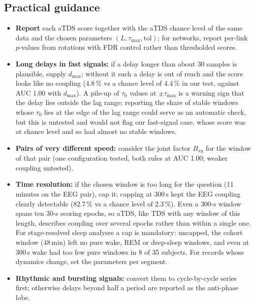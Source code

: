 \documentclass[11pt,a4paper]{article}
\begin{document}
\subsection*{Practical guidance}
\label{sec:guidance}
\begin{itemize}
\item \textbf{Report} each aTDS score together with the aTDS chance level of the same data and the chosen parameters $(L, \tau_{\max}, \mathrm{tol})$; for networks, report per-link $p$-values from rotations with FDR control rather than thresholded scores.
\item \textbf{Long delays in fast signals:} if a delay longer than about 30 samples is plausible, supply $d_{\max}$; without it such a delay is out of reach and the score looks like no coupling (4.8\,\% vs a chance level of 4.4\,\% in our test, against AUC 1.00 with $d_{\max}$). A pile-up of $\tau_0$ values at $\pm\tau_{\max}$ is a warning sign that the delay lies outside the lag range; reporting the share of stable windows whose $\tau_0$ lies at the edge of the lag range could serve as an automatic check, but this is untested and would not flag our fast-signal case, whose score was at chance level and so had almost no stable windows.
\item \textbf{Pairs of very different speed:} consider the joint factor $B_{xy}$ for the window of that pair (one configuration tested, both rules at AUC 1.00; weaker coupling untested).
\item \textbf{Time resolution:} if the chosen window is too long for the question (11 minutes on the EEG pair), cap it; capping at 300\,s kept the EEG coupling clearly detectable (82.7\,\% vs a chance level of 2.3\,\%). Even a 300-s window spans ten 30-s scoring epochs, so aTDS, like TDS with any window of this length, describes coupling over several epochs rather than within a single one. For stage-resolved sleep analyses a cap is mandatory: uncapped, the cohort window (48\,min) left no pure wake, REM or deep-sleep windows, and even at 300\,s wake had too few pure windows in 8 of 35 subjects. For records whose dynamics change, set the parameters per segment.
\item \textbf{Rhythmic and bursting signals:} convert them to cycle-by-cycle series first; otherwise delays beyond half a period are reported as the anti-phase lobe.
\end{itemize}
\end{document}
